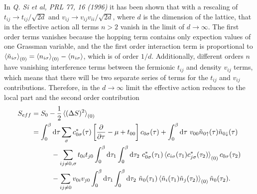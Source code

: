 \documentclass[12pt,a4paper]{scrartcl}
\numberwithin{equation}{section}
\begin{document}
In \textit{Q. Si et al, PRL 77, 16 (1996)} it has been shown that 
with a rescaling of $t_{ij} \rightarrow t_{ij}/\sqrt{2d}$ and $v_{ij} \rightarrow v_{ij}v_{ii}/\sqrt{2d}$,
where $d$ is the dimension of the lattice, that in the effective action 
all terms $n>2$ vanish in the limit of $d\rightarrow \infty$. 
The first order terms vanishes because the hopping term contains only expection values of one Grassman variable,
and the the first order interaction term is proportional to $\braket{ \tilde{n}_{i\sigma} }_{(0)} = \braket{ n_{i\sigma} }_{(0)} - \braket{n_{i\sigma}}$,
which is of order $1/d$.
Additionally, different orders $n$ have vanishing interference
terms between the fermionic $t_{ij}$ and density $v_{ij}$ terms, which means that
there will be two separate series of terms for the $t_{ij}$ and $v_{ij}$ contributions.
Therefore, in the $d\rightarrow \infty$ limit the effective action reduces to
the local part and the second order contribution
\begin{align}
S_{eff} 
&= S_0 - \frac{1}{2} \braket{ (\Delta S)^2 }_{(0)} \nonumber \\
&= \int_0^{\beta} \mathrm{d}\tau \sum_{\sigma} c^*_{0\sigma}(\tau)\left[ \frac{\partial}{\partial \tau} - \mu + t_{00} \right] c_{0\sigma}(\tau) 
    + \int_0^{\beta} \mathrm{d}\tau \ v_{00} \tilde{n}_{0\uparrow}(\tau)\tilde{n}_{0\downarrow}(\tau)  \nonumber \\
&\hspace{1cm}- \sum_{ij\neq 0,\sigma} t_{0i} t_{j0}  \int_0^{\beta} \mathrm{d}\tau_1 \int_0^{\beta} \mathrm{d}\tau_2 \ c^*_{0\sigma}(\tau_1) \braket{ c_{i\sigma}(\tau_1) c^*_{j\sigma}(\tau_2) }_{(0)}  c_{0\sigma}(\tau_2)  \nonumber \\
&\hspace{1cm}- \sum_{ij\neq 0} v_{0i} v_{j0}  \int_0^{\beta} \mathrm{d}\tau_1 \int_0^{\beta} \mathrm{d}\tau_2 \ \tilde{n}_{0}(\tau_1) \braket{ \tilde{n}_{i}(\tau_1)   \tilde{n}_{j}(\tau_2) }_{(0)}  \tilde{n}_{0}(\tau_2)  .
\end{align}
%
\end{document}
